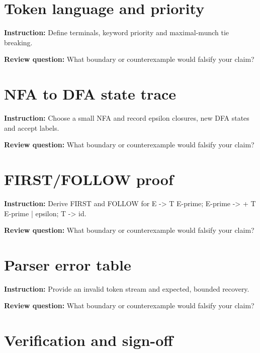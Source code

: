 \documentclass[10pt,letterpaper]{article}
\begin{document}
\section{Token language and priority}
\textbf{Instruction:} Define terminals, keyword priority and maximal-munch tie breaking.\par{}
\textbf{Review question:} What boundary or counterexample would falsify your claim?\par\section{NFA to DFA state trace}
\textbf{Instruction:} Choose a small NFA and record epsilon closures, new DFA states and accept labels.\par{}
\textbf{Review question:} What boundary or counterexample would falsify your claim?\par\section{FIRST/FOLLOW proof}
\textbf{Instruction:} Derive FIRST and FOLLOW for E -> T E-prime; E-prime -> + T E-prime | epsilon; T -> id.\par{}
\textbf{Review question:} What boundary or counterexample would falsify your claim?\par\section{Parser error table}
\textbf{Instruction:} Provide an invalid token stream and expected, bounded recovery.\par{}
\textbf{Review question:} What boundary or counterexample would falsify your claim?\par\section{Verification and sign-off}
\end{document}
